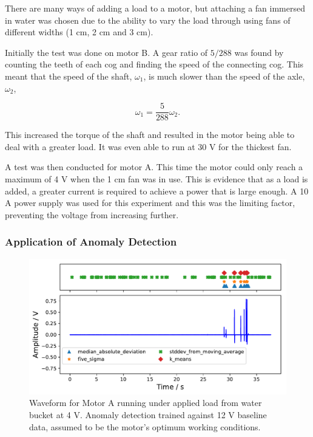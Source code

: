 There are many ways of adding a load to a motor, but attaching a fan immersed in water was chosen due to the ability to vary the load through using fans of different widths (1 cm, 2 cm and 3 cm).
    
Initially the test was done on motor B. A gear ratio of ${5}/{288}$ was found by counting the teeth of each cog and finding the speed of the connecting cog. This meant that the speed of the shaft, $\omega_1$, is much slower than the speed of the axle, $\omega _2$,

\begin{equation}
\omega_1 = \frac{5}{288} \omega_2.
\label{eq:gear_ratio}
\end{equation}

This increased the torque of the shaft and resulted in the motor being able to deal with a greater load. It was even able to run at 30 V for the thickest fan.

A test was then conducted for motor A. This time the motor could only reach a maximum of 4 V when the 1 cm fan was in use. This is evidence that as a load is added, a greater current is required to achieve a power that is large enough. A 10 A power supply was used for this experiment and this was the limiting factor, preventing the voltage from increasing further.

\subsubsection{Application of Anomaly Detection}

\begin{figure}[t]
    \includegraphics[width=1.0\textwidth]{fig/large_4V-9A_water_large_12V.pdf}
    \caption[Anomaly Plot Large Motor under Load]{Waveform for Motor A running under applied load from water bucket at 4 V. Anomaly detection trained against 12 V baseline data, assumed to be the motor's optimum working conditions.}
    \label{fig:largemotor_water4V}
\end{figure}

